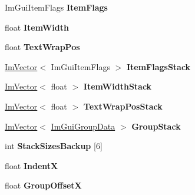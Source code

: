 \begin{DoxyCompactItemize}
Im\+Gui\+Item\+Flags {\bfseries Item\+Flags}
\item 
\mbox{\label{struct_im_gui_draw_context_a6327a65273ded49b6aa309167fca4b9e}} 
float {\bfseries Item\+Width}
\item 
\mbox{\label{struct_im_gui_draw_context_a0488b6a84b2f26ddd536fef2ae3f96c3}} 
float {\bfseries Text\+Wrap\+Pos}
\item 
\mbox{\label{struct_im_gui_draw_context_a895d75185a81dc21bb6153090ab5b018}} 
\hyperlink{class_im_vector}{Im\+Vector}$<$ Im\+Gui\+Item\+Flags $>$ {\bfseries Item\+Flags\+Stack}
\item 
\mbox{\label{struct_im_gui_draw_context_af6420717337b44394ad7ccbe55446db2}} 
\hyperlink{class_im_vector}{Im\+Vector}$<$ float $>$ {\bfseries Item\+Width\+Stack}
\item 
\mbox{\label{struct_im_gui_draw_context_ac282b2f910a8846f4c200c358974b12a}} 
\hyperlink{class_im_vector}{Im\+Vector}$<$ float $>$ {\bfseries Text\+Wrap\+Pos\+Stack}
\item 
\mbox{\label{struct_im_gui_draw_context_aa775f16a46bdfe8e131e25cab733afe0}} 
\hyperlink{class_im_vector}{Im\+Vector}$<$ \hyperlink{struct_im_gui_group_data}{Im\+Gui\+Group\+Data} $>$ {\bfseries Group\+Stack}
\item 
\mbox{\label{struct_im_gui_draw_context_aedfc8e281f1d72c7c1882c36bebb00d1}} 
int {\bfseries Stack\+Sizes\+Backup} \mbox{[}6\mbox{]}
\item 
\mbox{\label{struct_im_gui_draw_context_a3697085dca9164ca840d1fb1d52c8a66}} 
float {\bfseries IndentX}
\item 
\mbox{\label{struct_im_gui_draw_context_a30473e3e4b3eeba6c8d1acdaaedecba9}} 
float {\bfseries Group\+OffsetX}
\item 
\mbox{\label{struct_im_gui_draw_context_af8be098e7ddd1885343725f3fd61ce4a}} 

\end{DoxyCompactItemize}
